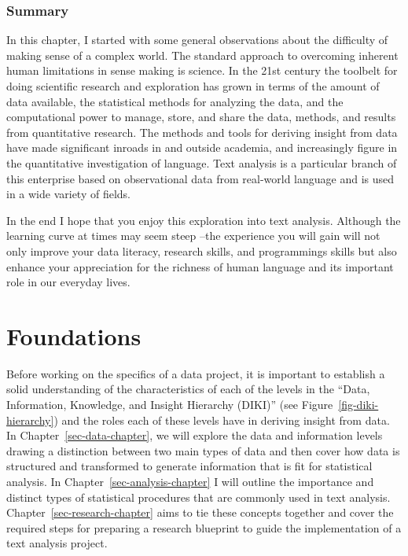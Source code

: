 \documentclass[
  letterpaper,
]{latex/krantz}
\theoremstyle{definition}
\theoremstyle{remark}
\begin{document}
\section*{Summary}\label{summary}


In this chapter, I started with some general observations about the
difficulty of making sense of a complex world. The standard approach to
overcoming inherent human limitations in sense making is science. In the
21st century the toolbelt for doing scientific research and exploration
has grown in terms of the amount of data available, the statistical
methods for analyzing the data, and the computational power to manage,
store, and share the data, methods, and results from quantitative
research. The methods and tools for deriving insight from data have made
significant inroads in and outside academia, and increasingly figure in
the quantitative investigation of language. Text analysis is a
particular branch of this enterprise based on observational data from
real-world language and is used in a wide variety of fields.

In the end I hope that you enjoy this exploration into text analysis.
Although the learning curve at times may seem steep --the experience you
will gain will not only improve your data literacy, research skills, and
programmings skills but also enhance your appreciation for the richness
of human language and its important role in our everyday lives.

\part{Foundations}

Before working on the specifics of a data project, it is important to
establish a solid understanding of the characteristics of each of the
levels in the ``Data, Information, Knowledge, and Insight Hierarchy
(DIKI)'' (see Figure~\ref{fig-diki-hierarchy}) and the roles each of
these levels have in deriving insight from data. In
Chapter~\ref{sec-data-chapter}, we will explore the data and information
levels drawing a distinction between two main types of data and then
cover how data is structured and transformed to generate information
that is fit for statistical analysis. In
Chapter~\ref{sec-analysis-chapter} I will outline the importance and
distinct types of statistical procedures that are commonly used in text
analysis. Chapter~\ref{sec-research-chapter} aims to tie these concepts
together and cover the required steps for preparing a research blueprint
to guide the implementation of a text analysis project.
\end{document}
